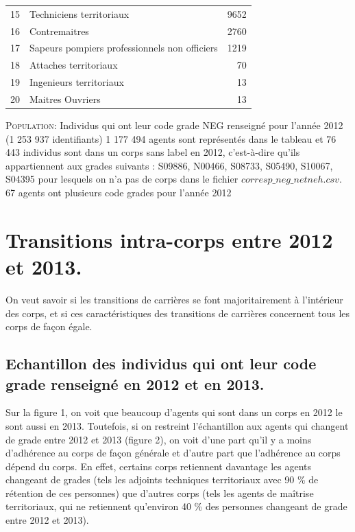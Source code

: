 \documentclass[11pt,a4paper]{article}
\begin{document}
\begin{table}[h!]
\begin{tabular}{llr}
	15 &                           Techniciens territoriaux &           9652 \\
	16 &                                      Contremaitres &           2760 \\
	17 &      Sapeurs pompiers professionnels non officiers &           1219 \\
	18 &                              Attaches territoriaux &             70 \\
	19 &                            Ingenieurs territoriaux &             13 \\
	20 &                                   Maitres Ouvriers &             13 \\
	\bottomrule
\end{tabular}
\begin{minipage}{15cm}
	\footnotesize
	\textsc{Population:} Individus qui ont leur code grade NEG renseigné pour l'année 2012 (1 253 937 identifiants) 1 177 494 agents sont représentés dans le tableau et 76 443 individus sont dans un corps sans label en 2012, c'est-à-dire qu'ils appartiennent aux grades suivants : S09886, N00466, S08733, S05490, S10067, S04395 pour lesquels on n'a pas de corps dans le fichier $corresp\_{}neg\_{}netneh.csv$. 67 agents ont plusieurs code grades pour l'année 2012\\
\end{minipage}
\end{table}





\section{Transitions intra-corps entre 2012 et 2013.}


On veut savoir si les transitions de carrières se font majoritairement à l'intérieur des corps, et si ces caractéristiques des transitions de carrières concernent tous les corps de façon égale.


\subsection{Echantillon des individus qui ont leur code grade renseigné en 2012 et en 2013.}

Sur la figure 1, on voit que beaucoup d'agents qui sont dans un corps en 2012 le sont aussi en 2013. Toutefois, si on restreint l'échantillon aux agents qui changent de grade entre 2012 et 2013 (figure 2), on voit d'une part qu'il y a moins d'adhérence au corps de façon générale et d'autre part que l'adhérence au corps dépend du corps. En effet, certains corps retiennent davantage les agents changeant de grades (tels les adjoints techniques territoriaux avec 90 \% de rétention de ces personnes) que d'autres corps (tels les agents de maîtrise territoriaux, qui ne retiennent qu'environ 40 \% des personnes changeant de grade entre 2012 et 2013).
\end{document}
